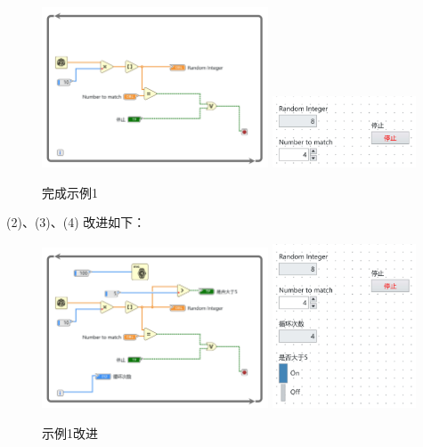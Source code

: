 \documentclass{../source/Experiment}
\begin{document}
        \begin{figure}[H]
            \centering
            \includegraphics[width = 0.6\textwidth]{lab8/lab1-a.jpg}
            \includegraphics[width = 0.38\textwidth]{lab8/lab1-b.jpg}
            \caption{完成示例1}
        \end{figure}

        (2)、(3)、(4) 改进如下：
        \begin{figure}[H]
            \centering
            \includegraphics[width = 0.6\textwidth]{lab8/lab1改进-a.jpg}
            \includegraphics[width = 0.38\textwidth]{lab8/lab1改进-b.jpg}
            \caption{示例1改进}
        \end{figure}
\end{document}
